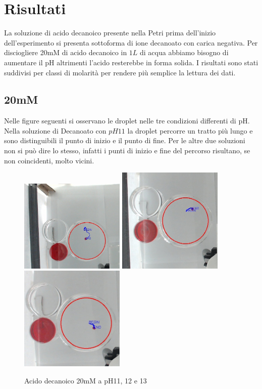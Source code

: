 \section{Risultati}
La soluzione di acido decanoico presente nella Petri prima dell'inizio dell'esperimento si presenta sottoforma di ione decanoato con carica negativa. Per disciogliere 20mM di acido decanoico in $1L$ di acqua abbiamo bisogno di aumentare il pH altrimenti l'acido resterebbe in forma solida. I risultati sono stati suddivisi per classi di molarità per rendere più semplice la lettura dei dati.

\subsection{20mM}
Nelle figure seguenti si osservano le droplet nelle tre condizioni differenti di pH. Nella soluzione di Decanoato con $pH11$ la droplet percorre un tratto più lungo e sono distinguibili il punto di inizio e il punto di fine. Per le altre due soluzioni non si può dire lo stesso, infatti i punti di inizio e fine del percorso risultano, se non coincidenti, molto vicini. 
\begin{figure}[h]
	\centering
   		{\includegraphics[width=5cm]{immagini/20mMpH11-2.jpg}} %
 	\hspace{2mm}   	
		{\includegraphics[width=5cm]{immagini/20mMpH12-2.jpg}}%
	\hspace{2mm}   	
		{\includegraphics[width=5cm]{immagini/20mMpH13-2.jpg}}%
	\caption{Acido decanoico 20mM a pH11, 12 e 13}
\end{figure}

